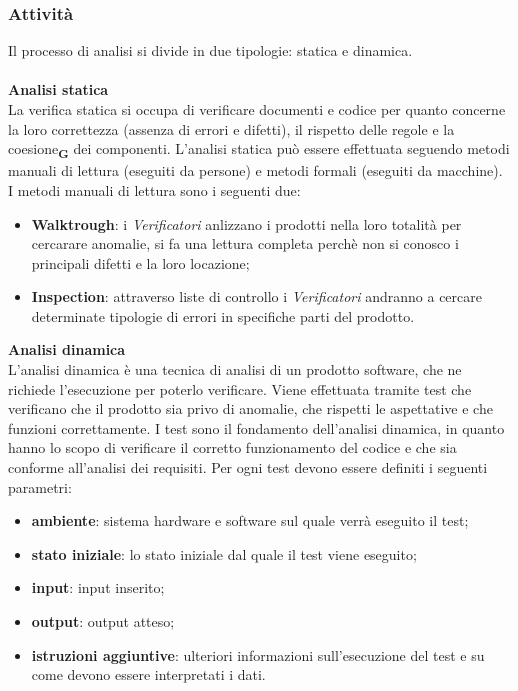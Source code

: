         \subsubsection{Attività}
            Il processo di analisi si divide in due tipologie: statica e dinamica.\\
            \\
            \textbf{Analisi statica}\\
            La verifica statica si occupa di verificare documenti e codice per quanto concerne la loro correttezza (assenza di errori e difetti), il rispetto delle regole e la coesione\textsubscript{\textbf{G}} dei componenti. L'analisi statica può essere effettuata seguendo metodi manuali di lettura (eseguiti da persone) e metodi formali (eseguiti da macchine). I metodi manuali di lettura sono i seguenti due:
            \begin{itemize}
                \item \textbf{Walktrough}: i \textit{Verificatori} anlizzano i prodotti nella loro totalità per cercarare anomalie, si fa una lettura completa perchè non si conosco i principali difetti e la loro locazione;
                \item \textbf{Inspection}: attraverso liste di controllo i \textit{Verificatori} andranno a cercare determinate tipologie di errori in specifiche parti del prodotto. 
            \end{itemize}
            \textbf{Analisi dinamica}\\
            L'analisi dinamica è una tecnica di analisi di un prodotto software, che ne richiede l'esecuzione per poterlo verificare. Viene effettuata tramite test che verificano che il prodotto sia privo di anomalie, che rispetti le aspettative e che funzioni correttamente.
            I test sono il fondamento dell'analisi dinamica, in quanto hanno lo scopo di verificare il corretto funzionamento del codice e che sia conforme all'analisi dei requisiti.
            Per ogni test devono essere definiti i seguenti parametri:
            \begin{itemize}
                \item \textbf{ambiente}: sistema hardware e software sul quale verrà eseguito il test;
                \item \textbf{stato iniziale}: lo stato iniziale dal quale il test viene eseguito;
                \item \textbf{input}: input inserito;
                \item \textbf{output}: output atteso;
                \item \textbf{istruzioni aggiuntive}: ulteriori informazioni sull'esecuzione del test e su come devono essere interpretati i dati.
            \end{itemize}
